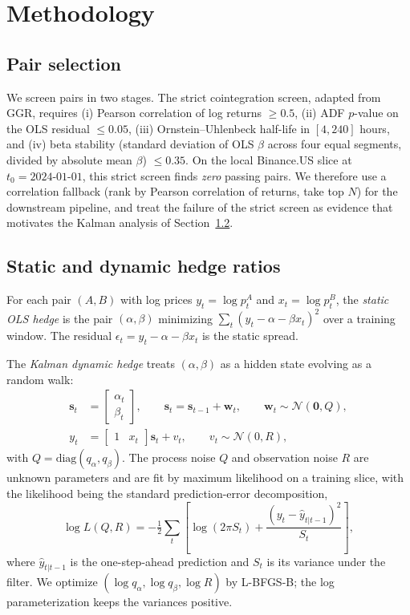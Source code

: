 \documentclass[11pt]{article}
\begin{document}
\section{Methodology} \label{sec:methods}

\subsection{Pair selection}

We screen pairs in two stages. The strict cointegration screen, adapted
from GGR, requires (i) Pearson correlation of log returns $\geq 0.5$,
(ii) ADF $p$-value on the OLS residual $\leq 0.05$, (iii) Ornstein--Uhlenbeck
half-life in $[4, 240]$ hours, and (iv) beta stability (standard deviation
of OLS $\beta$ across four equal segments, divided by absolute mean
$\beta$) $\leq 0.35$. On the local Binance.US slice at
$t_0 = 2024\text{-}01\text{-}01$, this strict screen finds \emph{zero}
passing pairs. We therefore use a correlation fallback (rank by Pearson
correlation of returns, take top $N$) for the downstream pipeline, and
treat the failure of the strict screen as evidence that motivates the
Kalman analysis of Section~\ref{sec:kalman}.

\subsection{Static and dynamic hedge ratios} \label{sec:kalman}

For each pair $(A, B)$ with log prices $y_t = \log p^A_t$ and
$x_t = \log p^B_t$, the \emph{static OLS hedge} is the pair
$(\alpha, \beta)$ minimizing $\sum_t (y_t - \alpha - \beta x_t)^2$ over
a training window. The residual $\epsilon_t = y_t - \alpha - \beta x_t$
is the static spread.

The \emph{Kalman dynamic hedge} treats $(\alpha, \beta)$ as a hidden
state evolving as a random walk:
\begin{align}
    \mathbf{s}_t &= \begin{bmatrix} \alpha_t \\ \beta_t \end{bmatrix},
    \qquad
    \mathbf{s}_t = \mathbf{s}_{t-1} + \mathbf{w}_t,
    \qquad \mathbf{w}_t \sim \mathcal{N}(\mathbf{0}, Q), \label{eq:state}\\
    y_t &= \begin{bmatrix} 1 & x_t \end{bmatrix} \mathbf{s}_t + v_t,
    \qquad v_t \sim \mathcal{N}(0, R), \label{eq:obs}
\end{align}
with $Q = \mathrm{diag}(q_\alpha, q_\beta)$. The process noise $Q$ and
observation noise $R$ are unknown parameters and are fit by maximum
likelihood on a training slice, with the likelihood being the standard
prediction-error decomposition,
\begin{equation}
    \log L(Q, R) = -\tfrac{1}{2} \sum_t \left[ \log(2\pi S_t)
    + \frac{(y_t - \hat{y}_{t|t-1})^2}{S_t} \right],
\end{equation}
where $\hat{y}_{t|t-1}$ is the one-step-ahead prediction and $S_t$ is
its variance under the filter. We optimize $(\log q_\alpha, \log q_\beta,
\log R)$ by L-BFGS-B; the log parameterization keeps the variances
positive.
\end{document}
